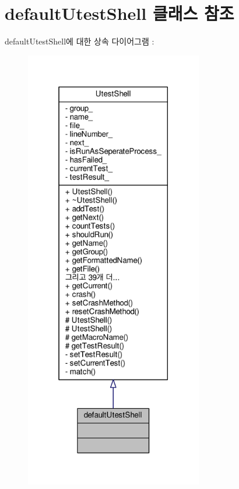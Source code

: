 \hypertarget{classdefault_utest_shell}{}\section{default\+Utest\+Shell 클래스 참조}
\label{classdefault_utest_shell}


default\+Utest\+Shell에 대한 상속 다이어그램 \+: 
\nopagebreak
\begin{figure}[H]
\begin{center}
\leavevmode
\includegraphics[height=550pt]{classdefault_utest_shell__inherit__graph}
\end{center}
\end{figure}


